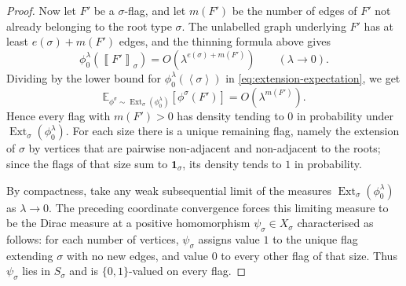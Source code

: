 \documentclass[11pt]{article}
\theoremstyle{definition}
\newcommand{\E}{\mathbb{E}}
\newcommand{\Ext}{\operatorname{Ext}}
\newcommand{\brak}[1]{\left\langle #1\right\rangle}
\newcommand{\avg}[2]{\left\llbracket #1 \right\rrbracket_{#2}}
\newcommand{\one}{\mathbf 1}
\begin{document}
\begin{proof}
Now let $F'$ be a $\sigma$-flag, and let $m(F')$ be the number of edges of $F'$ not already
belonging to the root type $\sigma$.  The unlabelled graph underlying $F'$ has
at least $e(\sigma)+m(F')$ edges, and the thinning formula above gives
\[
  \phi_0^\lambda(\avg{F'}{\sigma})=O(\lambda^{e(\sigma)+m(F')})
  \qquad(\lambda\to0).
\]
Dividing by the lower bound for $\phi_0^\lambda(\brak\sigma)$ in
\eqref{eq:extension-expectation}, we get
\[
  \E_{\phi^\sigma\sim\Ext_\sigma(\phi_0^\lambda)}[\phi^\sigma(F')]
  =O(\lambda^{m(F')}).
\]
Hence every flag with $m(F')>0$ has density tending to $0$ in probability under
$\Ext_\sigma(\phi_0^\lambda)$.  For each size there is a unique remaining flag, namely
the extension of $\sigma$ by vertices that are pairwise non-adjacent and non-adjacent to
the roots; since the flags of that size sum to $\one_\sigma$, its density tends to $1$ in
probability.

By compactness, take any weak subsequential limit of the measures
$\Ext_\sigma(\phi_0^\lambda)$ as $\lambda\to0$.  The preceding coordinate convergence
forces this limiting measure to be the Dirac measure at a positive homomorphism
$\psi_\sigma\in X_\sigma$ characterised as follows: for each number of vertices,
$\psi_\sigma$ assigns value $1$ to the unique flag extending $\sigma$ with no new edges,
and value $0$ to every other flag of that size.  Thus $\psi_\sigma$ lies in $S_\sigma$ and
is $\{0,1\}$-valued on every flag.
\end{proof}
\end{document}
